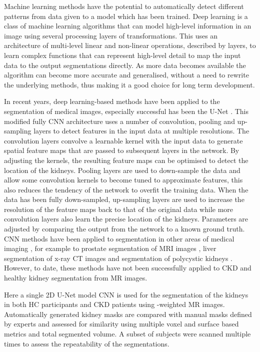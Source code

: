 Machine learning methods have the potential to automatically detect different patterns from data given to a model which has been trained. Deep learning is a class of machine learning algorithms that can model high-level information in an image using several processing layers of transformations. This uses an architecture of multi-level linear and non-linear operations, described by layers, to learn complex functions that can represent high-level detail to map the input data to the output segmentations directly. As more data becomes available the algorithm can become more accurate and generalised, without a need to rewrite the underlying methods, thus making it a good choice for long term development. 

In recent years, deep learning-based methods have been applied to the segmentation of medical images, especially successful has been the U-Net \cite{ronneberger_u-net_2015}. This modified fully \ac{CNN} architecture uses a number of convolution, pooling and up-sampling layers to detect features in the input data at multiple resolutions. The convolution layers convolve a learnable kernel with the input data to generate spatial feature maps that are passed to subsequent layers in the network. By adjusting the kernels, the resulting feature maps can be optimised to detect the location of the kidneys. Pooling layers are used to down-sample the data and allow some convolution kernels to become tuned to approximate features, this also reduces the tendency of the network to overfit the training data. When the data has been fully down-sampled, up-sampling layers are used to increase the resolution of the feature maps back to that of the original data while more convolution layers also learn the precise location of the kidneys. Parameters are adjusted by comparing the output from the network to a known ground truth. \ac{CNN} methods have been applied to segmentation in other areas of medical imaging \cite{lu_automatic_2017, sharma_automatic_2017, wachinger_deepnat_2018, fu_novel_2018}, for example to prostate segmentation of \ac{MRI} images \cite{hassanzadeh_convolutional_2019}, liver segmentation of x-ray \ac{CT} images \cite{li_h-denseunet_2018} and segmentation of polycystic kidneys \cite{kline_performance_2017, van_gastel_automatic_2019, shin_expert-level_2020}. However, to date, these methods have not been successfully applied to \ac{CKD} and healthy kidney segmentation from MR images. 

Here a single 2D U-Net model \ac{CNN} is used for the segmentation of the kidneys in both \ac{HC} participants and \ac{CKD} patients using \ttwo-weighted MR images. Automatically generated kidney masks are compared with manual masks defined by experts and assessed for similarity using multiple voxel and surface based metrics and total segmented volume. A subset of subjects were scanned multiple times to assess the repeatability of the segmentations.

